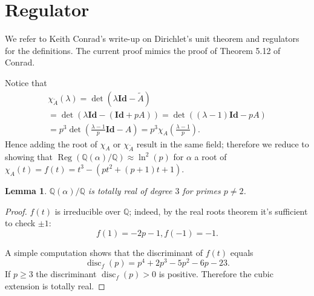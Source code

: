 \documentclass[a4paper]{article}
\newtheorem{Lem}[Thm]{Lemma}
\newcommand{\Q}{\mathbb{Q}}        %
\newcommand{\Id}{\mathbf{Id}}        %
\DeclareMathOperator{\Reg}{Reg}        %
\DeclareMathOperator{\disc}{disc}        %
\begin{document}
\section{Regulator}
We refer to Keith Conrad's write-up on Dirichlet's unit theorem and regulators \cite{conraddirichlet} for the definitions.
The current proof mimics the proof of Theorem 5.12 of Conrad.

Notice that 
\begin{multline}
\chi_{\tilde A}(\lambda) 
= \det(\lambda \Id - \tilde A) \\
= \det(\lambda \Id - (\Id + p A))
= \det((\lambda - 1) \Id - p A)\\
= p^3 \det(\frac{\lambda - 1}p \Id - A)
= p^3 \chi_A(\frac{\lambda - 1}p)
.\end{multline}
Hence adding the root of $\chi_{A}$ or $\chi_{\tilde A}$ result in the same field; therefore we reduce to showing that 
$\Reg ( \Q(\alpha)/\Q ) \approx \ln^2(p) $ for $\alpha$ a root of $\chi_{A}(t) = f(t) = t^3 - (p t^2 + (p + 1) t + 1) $.

\begin{Lem}
$\Q(\alpha)/\Q$ is totally real of degree $3$ for primes $p \ne 2$.
\end{Lem}
\begin{proof}
$f(t)$ is irreducible over $\Q$; indeed, by the real roots theorem it's sufficient to check $\pm 1$:
$$f(1) = - 2 p - 1, f(-1) = - 1 .$$

A simple computation shows that the discriminant of $f(t)$ equals 
\[
	\disc_f(p) = p^4 + 2 p^3 - 5 p^2 - 6 p - 23 
.\]
If $p \ge 3$ the discriminant  $\disc_f(p) > 0$ is positive.
Therefore the cubic extension is totally real.
\end{proof}
\end{document}
